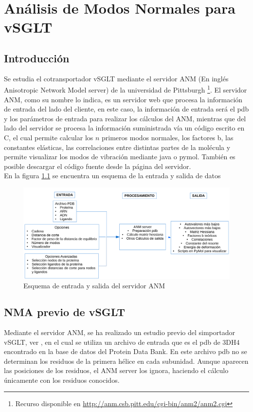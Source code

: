 \chapter{An\'{a}lisis de Modos Normales para vSGLT}\label{ch:4}

\section{Introducci\'{o}n}
Se estudia el cotransportador vSGLT mediante el servidor ANM (En ingl\'{e}s Anisotropic Network Model server) de la universidad de Pittsburgh \cite{Eyal2015}\footnote{Recurso disponible en \url{http://anm.csb.pitt.edu/cgi-bin/anm2/anm2.cgi}}. El servidor ANM, como su nombre lo indica, es un servidor web que procesa la informaci\'{o}n de entrada del lado del cliente, en este caso, la informaci\'{o}n de entrada ser\'{a} el pdb y los par\'{a}metros de entrada para realizar los c\'{a}lculos del ANM, mientras que del lado del servidor se procesa la informaci\'{o}n suministrada v\'{i}a un c\'{o}digo escrito en C, el cual permite calcular los $n$ primeros modos normales, los factores b, las constantes el\'{a}sticas, las correlaciones entre distintas partes de la mol\'{e}cula y permite visualizar los modos de vibraci\'{o}n mediante java o pymol. Tambi\'{e}n es posible descargar el c\'{o}digo fuente desde la p\'{a}gina del servidor.\\

En la figura \ref{fig:flujo} se encuentra un esquema de la entrada y salida de datos
\begin{figure}[h]
 \centering
    \includegraphics[scale=0.6]{./Kap4/flujo.pdf} 
\caption{Esquema de entrada y salida del servidor ANM}\label{fig:flujo}
\end{figure}

\section{NMA previo de vSGLT}
Mediante el servidor ANM, se ha realizado un estudio previo del simportador vSGLT, ver \cite{Cabrera2017}, en el cual se utiliza un archivo de entrada que es el pdb de 3DH4 encontrado en la base de datos del Protein Data Bank. En este archivo pdb no se determinan los residuos de la primera h\'{e}lice en cada subunidad. Aunque aparecen las posiciones de los residuos, el ANM server los ignora, haciendo el c\'{a}lculo \'{u}nicamente con los residuos conocidos.\\

